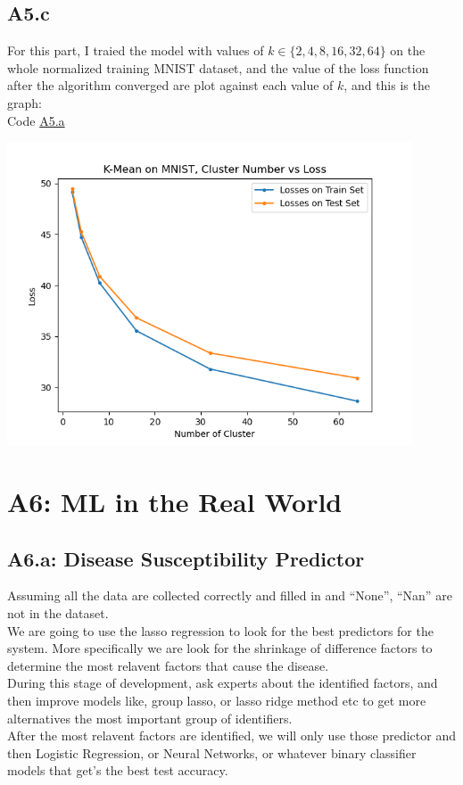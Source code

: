 \documentclass[]{article}
\begin{document}
    \subsection*{A5.c}
        For this part, I traied the model with values of $k\in \{2, 4, 8, 16, 32, 64\}$ on the whole normalized training MNIST dataset, and the value of the loss function after the algorithm converged are plot against each value of $k$, and this is the graph: 
        \\
        Code \hyperref[A5.a]{A5.a}
        \begin{center}
            \includegraphics*[width=12cm]{A5bplots/22-04-21-A5b-k-vs-loss.png}
        \end{center}
    
        
        
\section*{A6: ML in the Real World}
    \subsection*{A6.a: Disease Susceptibility Predictor}
        Assuming all the data are collected correctly and filled in and ``None'', ``Nan'' are not in the dataset. 
        \\[1.1em]
        We are going to use the lasso regression to look for the best predictors for the system. More specifically we are look for the shrinkage of difference factors to determine the most relavent factors that cause the disease. 
        \\[1.1em]
        During this stage of development, ask experts about the identified factors, and then improve models like, group lasso, or lasso ridge method etc to get more alternatives the most important group of identifiers. 
        \\[1.1em]
        After the most relavent factors are identified, we will only use those predictor and then Logistic Regression, or Neural Networks, or whatever binary classifier models that get's the best test accuracy. 
\end{document}
